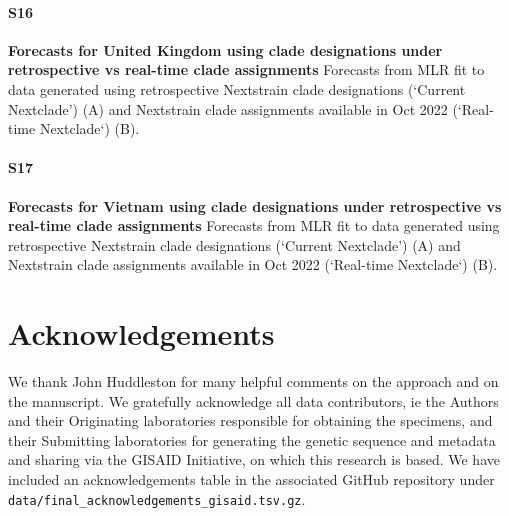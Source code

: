\documentclass[10pt,letterpaper]{article}
\begin{document}
\paragraph*{S16}
\label{fig:S16}
{\bf Forecasts for United Kingdom using clade designations under retrospective vs real-time clade assignments }
Forecasts from MLR fit to data generated using retrospective Nextstrain clade designations (‘Current Nextclade’) (A) and Nextstrain clade assignments
available in Oct 2022 (‘Real-time Nextclade‘) (B).

\paragraph*{S17}
\label{fig:S17}
{\bf Forecasts for Vietnam using clade designations under retrospective vs real-time clade assignments}
Forecasts from MLR fit to data generated using retrospective Nextstrain clade designations (‘Current Nextclade’) (A) and Nextstrain clade assignments available
in Oct 2022 (‘Real-time Nextclade‘) (B).


\section*{Acknowledgements}

We thank John Huddleston for many helpful comments on the approach and on the manuscript.
We gratefully acknowledge all data contributors, ie the Authors and their Originating laboratories responsible for obtaining the specimens, and their Submitting laboratories for generating the genetic sequence and metadata and sharing via the GISAID Initiative, on which this research is based.
We have included an acknowledgements table in the associated GitHub repository under \texttt{data/final\_acknowledgements\_gisaid.tsv.gz}.

\nolinenumbers

%
%
%

%
\end{document}
